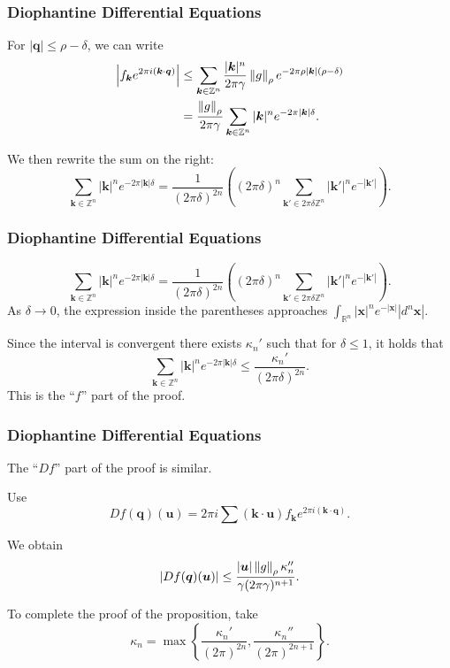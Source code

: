 \documentclass{beamer}
\newcommand{\Z}{\mathbb{Z}}
\newcommand{\R}{\mathbb{R}}
\newcommand{\bp}[1]{\bm{#1}}
\newcommand{\genericdel}[4]{%
  \ifcase#3\relax
  #1#4#2\or
  \bigl#1#4\bigr#2\or
  \Bigl#1#4\Bigr#2\or
  \biggl#1#4\biggr#2\or
  \Biggl#1#4\Biggr#2\else
  \left#1#4\right#2\fi
}
\newcommand{\enVert}[2][-1]{\genericdel\|\|{#1}{#2}}
\let\norm\enVert
\begin{document}
\begin{frame}
  \frametitle{Diophantine Differential Equations}
  For $|\bp{q}| \leq \rho - \delta$, we can write
  \begin{align*}
    \left| f_{\bp{k}}e^{2 \pi i (\bp{k} \cdot \bp{q})} \right|
    & \leq \sum_{\bp{k} \in \Z^n} \frac{|\bp{k}|^n}{2 \pi \gamma}
      \norm{g}_{\rho} e^{-2 \pi \rho |\bp{k}|(\rho - \delta)}\\
    &= \frac{\norm{g}_{\rho}}{2 \pi \gamma} \sum_{\bp{k} \in \Z^n} |\bp{k}|^n
      e^{-2 \pi |\bp{k}| \delta}.
  \end{align*}

  We then rewrite the sum on the right:
  \begin{equation*}
     \sum_{\bp{k} \in \Z^n} |\bp{k}|^n
       e^{-2 \pi |\bp{k}| \delta} = \frac{1}{(2 \pi \delta)^{2n}} \left( (2 \pi
        \delta)^n \sum_{\bp{k}' \in 2 \pi \delta \Z^n} |\bp{k}'|^n
       e^{-|\bp{k}'|}\right).
  \end{equation*}
\end{frame}

\begin{frame}
  \frametitle{Diophantine Differential Equations}
  \begin{equation*}
     \sum_{\bp{k} \in \Z^n} |\bp{k}|^n
      e^{-2 \pi |\bp{k}| \delta} = \frac{1}{(2 \pi \delta)^{2n}} \left( (2 \pi
        \delta)^n \sum_{\bp{k}' \in 2 \pi \delta \Z^n} |\bp{k}'|^n
        e^{-|\bp{k}'|}\right).
  \end{equation*}
  As $\delta \to 0$, the expression inside the parentheses approaches
  $\int_{\R^n} |\bp{x}|^n e^{-|\bp{x}|} |d^n\bp{x}|$.

  Since the interval is convergent there exists $\kappa_n'$ such that for
  $\delta \leq 1$, it holds that
  \begin{equation*}
    \sum_{\bp{k} \in \Z^n} |\bp{k}|^n e^{-2 \pi |\bp{k}| \delta} \leq
    \frac{\kappa_n'}{(2 \pi \delta)^{2n}}.
  \end{equation*}
  This is the ``$f$'' part of the proof.
\end{frame}

\begin{frame}
  \frametitle{Diophantine Differential Equations}
  The ``$Df$'' part of the proof is similar.
  
  Use
  \begin{equation*}
    Df(\bp{q})(\bp{u}) = 2 \pi i \sum (\bp{k} \cdot \bp{u}) f_{\bp{k}} e^{2 \pi
      i (\bp{k} \cdot \bp{q})}.
  \end{equation*}

  We obtain
  \begin{equation*}
    |Df(\bp{q})(\bp{u})| \leq \frac{|\bp{u}| \norm{g}_{\rho} \kappa_n''}{\gamma
      (2 \pi \gamma)^{n+1}}.
  \end{equation*}

  To complete the proof of the proposition, take
  \begin{equation*}
    \kappa_n = \max \left\{ \frac{\kappa_n'}{(2 \pi)^{2n}},
      \frac{\kappa_n''}{(2\pi)^{2n + 1}} \right\}.
  \end{equation*}
\end{frame}
\end{document}
